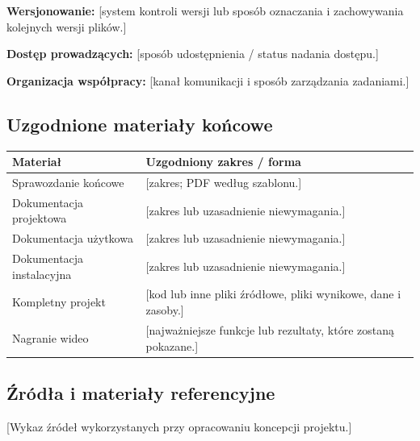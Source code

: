\documentclass[11pt,a4paper,oneside]{article}
\newif\ifpodpowiedzi
\newcommand{\podpowiedz}[1]{\ifpodpowiedzi\par\begingroup\small\color{hintcolor}\textit{Wskazówka: #1}\par\endgroup\fi}
\newcommand{\pole}[1]{\textnormal{[#1]}}
\begin{document}
\textbf{Wersjonowanie:}
\pole{system kontroli wersji lub sposób oznaczania i zachowywania kolejnych wersji plików.}\par

\textbf{Dostęp prowadzących:}
\pole{sposób udostępnienia / status nadania dostępu.}\par

\textbf{Organizacja współpracy:}
\pole{kanał komunikacji i sposób zarządzania zadaniami.}

\subsection{Uzgodnione materiały końcowe}
\podpowiedz{Uzupełnij tabelę z prowadzącymi. Sprawozdanie końcowe, kompletny projekt z plikami źródłowymi oraz nagranie są wymagane. Pozostałą dokumentację dostosujcie do projektu. Wpiszcie zakres i formę; przy dokumencie niewymaganym podajcie krótkie uzasadnienie.}
\begin{tabularx}{\textwidth}{@{}p{} Y@{}}
\toprule
Materiał & Uzgodniony zakres / forma\\
\midrule
Sprawozdanie końcowe & \pole{zakres; PDF według szablonu.}\\
Dokumentacja projektowa & \pole{zakres lub uzasadnienie niewymagania.}\\
Dokumentacja użytkowa & \pole{zakres lub uzasadnienie niewymagania.}\\
Dokumentacja instalacyjna & \pole{zakres lub uzasadnienie niewymagania.}\\
Kompletny projekt & \pole{kod lub inne pliki źródłowe, pliki wynikowe, dane i zasoby.}\\
Nagranie wideo & \pole{najważniejsze funkcje lub rezultaty, które zostaną pokazane.}\\
\bottomrule
\end{tabularx}
\podpowiedz{Dokumenty przygotowuje się w LaTeX-u według udostępnionych szablonów i oddaje w PDF. Istotne późniejsze zmiany ustaleń wymagają uzgodnienia z prowadzącymi i odnotowania.}

\subsection{Źródła i materiały referencyjne}
\podpowiedz{Wskaż źródła wykorzystane przy opracowaniu koncepcji: dokumentację techniczną, publikacje, zbiory danych, zasoby i rozwiązania referencyjne. Dla stron internetowych podaj tytuł, adres i datę dostępu. Jeśli nie korzystano ze źródeł zewnętrznych, wpisz tę informację.}
\pole{Wykaz źródeł wykorzystanych przy opracowaniu koncepcji projektu.}
\end{document}
